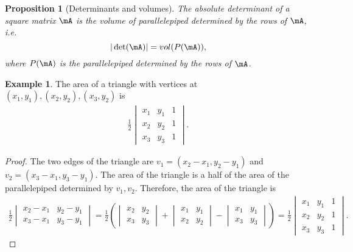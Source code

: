 \documentclass[11pt]{article}
\theoremstyle{plain}
\newtheorem{prop}{Proposition}
\theoremstyle{definition}
\newtheorem{example}{Example}
\begin{document}
\begin{prop}[Determinants and volumes]
The absolute determinant of a square matrix $\mA$ is the volume of parallelepiped determined by the rows of $\mA$, i.e.\
	\[ |\det(\mA)| = vol(P(\mA)), \]
	where $P(\mA)$ is the parallelepiped determined by the rows of $\mA$.
\end{prop}

\begin{example}
	The area of a triangle with vertices at $(x_1,y_1), (x_2,y_2), (x_3,y_2)$ is
	\begin{align}
		\frac{1}{2} \begin{vmatrix}
			x_1 & y_1 & 1\\
			x_2 & y_2 & 1\\
			x_3 & y_3 & 1
		\end{vmatrix}.
	\end{align}
	
	\begin{proof}
		The two edges of the triangle are $v_1 = (x_2 - x_1, y_2 -y_1)$ and $v_2 = (x_3 - x_1, y_3 -y_1)$. The area of the triangle is a half of the area of the parallelepiped determined by $v_1, v_2$. Therefore, the area of the triangle is 
		\begin{align}
			\frac{1}{2} \begin{vmatrix}
				x_2 - x_1 &  y_2 - y_1\\
				x_3 - x_1& y_3 -y_1
			\end{vmatrix} =  \frac{1}{2} \left(  \begin{vmatrix}
				x_2  &  y_2 \\
				x_3 & y_3
			\end{vmatrix} + \begin{vmatrix}
				x_1 &  y_1\\
				x_2& y_2
			\end{vmatrix}  - \begin{vmatrix}
				x_1 &  y_1\\
				x_3 & y_3 
			\end{vmatrix}    \right) = \frac{1}{2} \begin{vmatrix}
			x_1 & y_1 & 1\\
			x_2 & y_2 & 1\\
			x_3 & y_3 & 1
		\end{vmatrix}.
		\end{align}
	\end{proof}
\end{example}
\end{document}
